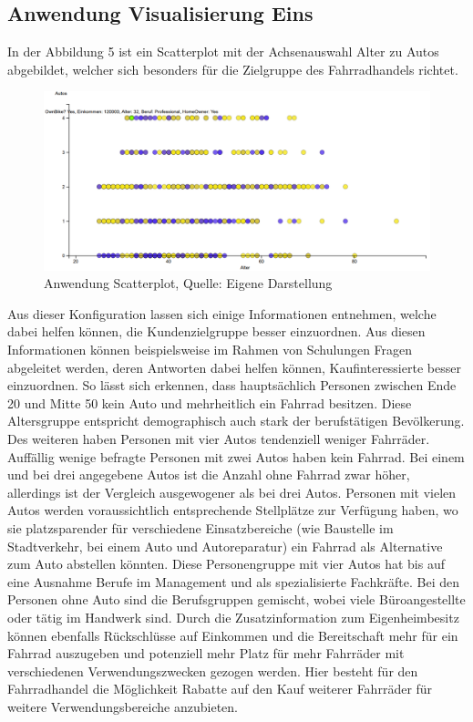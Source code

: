 \documentclass[usegeometry=true]{scrartcl}
\begin{document}
\subsection{Anwendung Visualisierung Eins}
In der Abbildung 5 ist ein Scatterplot mit der Achsenauswahl Alter zu Autos abgebildet, welcher sich besonders für die Zielgruppe des Fahrradhandels richtet.
\begin{figure}[h]
\begin{center}
\includegraphics[width=16cm]{Bilder/ScatterplotA1.png}
\caption{Anwendung Scatterplot, Quelle: Eigene Darstellung}
\end{center}
\end{figure}
\newline Aus dieser Konfiguration lassen sich einige Informationen entnehmen, welche dabei helfen können, die Kundenzielgruppe besser einzuordnen. Aus diesen Informationen können beispielsweise im Rahmen von Schulungen Fragen abgeleitet werden, deren Antworten dabei helfen können, Kaufinteressierte besser einzuordnen. 
So lässt sich erkennen, dass hauptsächlich Personen zwischen Ende 20 und Mitte 50 kein Auto und mehrheitlich ein Fahrrad besitzen. Diese Altersgruppe entspricht demographisch auch stark der berufstätigen Bevölkerung. Des weiteren haben Personen mit vier Autos tendenziell weniger Fahrräder. Auffällig wenige befragte Personen mit zwei Autos haben kein Fahrrad. Bei einem und bei drei angegebene Autos ist die Anzahl ohne Fahrrad zwar höher, allerdings ist der Vergleich ausgewogener als bei drei Autos. Personen mit vielen Autos werden voraussichtlich entsprechende Stellplätze zur Verfügung haben, wo sie platzsparender für verschiedene Einsatzbereiche (wie Baustelle im Stadtverkehr, bei einem Auto und Autoreparatur) ein Fahrrad als Alternative zum Auto abstellen könnten. 
Diese Personengruppe mit vier Autos hat bis auf eine Ausnahme Berufe im Management und als spezialisierte Fachkräfte. Bei den Personen ohne Auto sind die Berufsgruppen gemischt, wobei viele Büroangestellte oder tätig im Handwerk sind.
Durch die Zusatzinformation zum Eigenheimbesitz können ebenfalls Rückschlüsse auf Einkommen und die Bereitschaft mehr für ein Fahrrad auszugeben und potenziell mehr Platz für mehr Fahrräder mit verschiedenen Verwendungszwecken gezogen werden. Hier besteht für den Fahrradhandel die Möglichkeit Rabatte auf den Kauf weiterer Fahrräder für weitere Verwendungsbereiche anzubieten.
\end{document}

